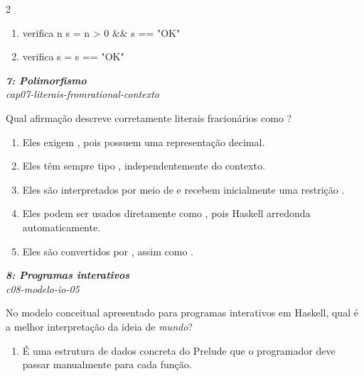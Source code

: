 \documentclass[a4paper,10pt,brazil]{article}
\begin{document}
\begin{multicols}{2}
\begin{enumerate}
  \item \begin{haskellcode}
verifica n s = n > 0 && s == "OK"
\end{haskellcode}

  \item \begin{haskellcode}
verifica s = s == "OK"
\end{haskellcode}


\end{enumerate}

\begin{flushright}
  \footnotesize
  \textit{\textbf{7: Polimorfismo}}\\
  \textit{cap07-literais-fromrational-contexto}\\

\end{flushright}
Qual afirmação descreve corretamente literais fracionários como ?
\begin{enumerate}
  \item Eles exigem , pois possuem uma representação decimal.
  \item Eles têm sempre tipo , independentemente do contexto.
  \item Eles são interpretados por meio de  e recebem inicialmente uma restrição .
  \item Eles podem ser usados diretamente como , pois Haskell arredonda automaticamente.
  \item Eles são convertidos por , assim como .

\end{enumerate}

\begin{flushright}
  \footnotesize
  \textit{\textbf{8: Programas interativos}}\\
  \textit{c08-modelo-io-05}\\

\end{flushright}
No modelo conceitual apresentado para programas interativos em Haskell, qual é a melhor interpretação da ideia de \emph{mundo}?

\begin{enumerate}
  \item É uma estrutura de dados concreta do Prelude que o programador deve passar manualmente para cada função.


\end{enumerate}
\end{multicols}
\end{document}
